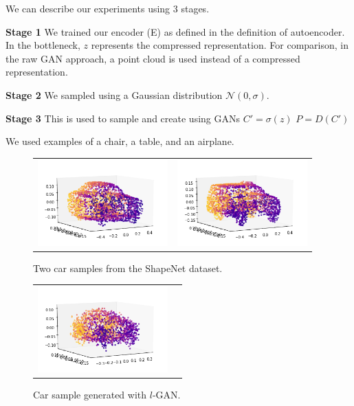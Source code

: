 \documentclass[12pt]{article}
\begin{document}
    We can describe our experiments using 3 stages.

    \textbf{Stage 1}
    We trained our encoder (E) as defined in the definition of autoencoder.
    In the bottleneck, $z$ represents the compressed representation.
    For comparison, in the raw GAN approach, a point cloud is used instead of a compressed representation.

    \textbf{Stage 2}
    We sampled using a Gaussian distribution $\mathcal{N}(0,\sigma)$.

    \textbf{Stage 3}
    This is used to sample and create using GANs
    $C' = \sigma(z)$
    $P = D(C')$

    We used examples of a chair, a table, and an airplane.

    \begin{figure}
        \centering
        \begin{tabular}{cc}
            \includegraphics[width = 50mm]{car-shapenet-1} &
            \includegraphics[width = 50mm]{car-shapenet-2} \\
        \end{tabular}
        \caption{Two car samples from the ShapeNet dataset.}
    \end{figure}


    \begin{figure}
        \centering
        \begin{tabular}{cc}
            \includegraphics[width = 50mm]{car-lgan}
        \end{tabular}
        \caption{Car sample generated with $l$-GAN.}
    \end{figure}
\end{document}
